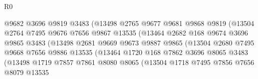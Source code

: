\begin{lexlean}{R0}
\begin{coremodule}
                                @9682
                                @3696
                                @9819
                                @3483
                                (@13498
                                  @2765
                                  @9677
                                  @9681
                                  @9868
                                  @9819
                                  (@13504
                                    @2764
                                    @7495
                                    @9676
                                    @7656
                                    @9867
                                    @13535
                                    (@13464
                                      @2682
                                      @168
                                      @9674
                                      @3696
                                      @9865
                                      @3483
                                      (@13498
                                        @2681
                                        @9669
                                        @9673
                                        @9887
                                        @9865
                                        (@13504
                                          @2680
                                          @7495
                                          @9668
                                          @7656
                                          @9886
                                          @13535
                                          (@13464
                                            @1720
                                            @168
                                            @7862
                                            @3696
                                            @8065
                                            @3483
                                            (@13498
                                              @1719
                                              @7857
                                              @7861
                                              @8080
                                              @8065
                                              (@13504
                                                @1718
                                                @7495
                                                @7856
                                                @7656
                                                @8079
                                                @13535

\end{coremodule}
\end{lexlean}

